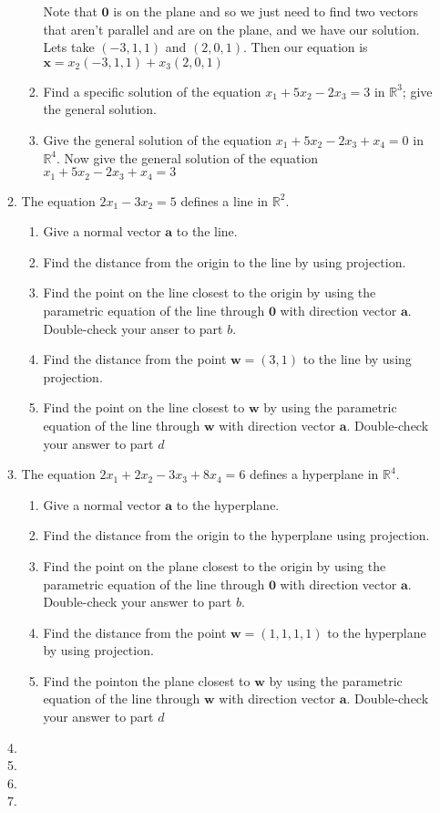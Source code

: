 \documentclass[letterpaper]{article}
\begin{document}
\begin{enumerate}
\begin{enumerate}
\begin{enumerate}
      Note that $\mathbf{0}$ is on the plane and so we just need to find two vectors that aren't parallel and are on the plane, and we have our solution. Lets take $(-3,1,1)$ and $(2,0,1)$. Then our equation is $\mathbf{x}=x_2(-3,1,1)+x_3(2,0,1)$
    \item
      Find a specific solution of the equation $x_1+5x_2-2x_3=3$ in $\mathbb{R}^3$; give the general solution.
    \item
      Give the general solution of the equation $x_1+5x_2-2x_3+x_4=0$ in $\mathbb{R}^4$. Now give the general solution of the equation $x_1+5x_2-2x_3+x_4=3$
    \end{enumerate}
  \item
    The equation $2x_1-3x_2=5$ defines a line in $\mathbb{R}^2$.
    \begin{enumerate}
    \item
      Give a normal vector $\mathbf{a}$ to the line.
    \item
      Find the distance from the origin to the line by using projection.
    \item
      Find the point on the line closest to the origin by using the parametric equation of the line through $\mathbf{0}$ with direction vector $\mathbf{a}$. Double-check your anser to part $b$.
    \item
      Find the distance from the point $\mathbf{w}=(3,1)$ to the line by using projection.
    \item
      Find the point on the line closest to $\mathbf{w}$ by using the parametric equation of the line through $\mathbf{w}$ with direction vector $\mathbf{a}$. Double-check your answer to part $d$
    \end{enumerate}
  \setcounter{enumii}{8}
  \item
    The equation $2x_1+2x_2-3x_3+8x_4=6$ defines a hyperplane in $\mathbb{R}^4$.
    \begin{enumerate}
    \item
      Give a normal vector $\mathbf{a}$ to the hyperplane.
    \item
      Find the distance from the origin to the hyperplane using projection.
    \item
      Find the point on the plane closest to the origin by using the parametric equation of the line through $\mathbf{0}$ with direction vector $\mathbf{a}$. Double-check your answer to part $b$.
    \item
      Find the distance from the point $\mathbf{w}=(1,1,1,1)$ to the hyperplane by using projection.
    \item
      Find the pointon the plane closest to $\mathbf{w}$ by using the parametric equation of the line through $\mathbf{w}$ with direction vector $\mathbf{a}$. Double-check your answer to part $d$
    \end{enumerate}
  \item
  \item
  \item
  \item

  \end{enumerate}
\end{enumerate}
\end{document}
